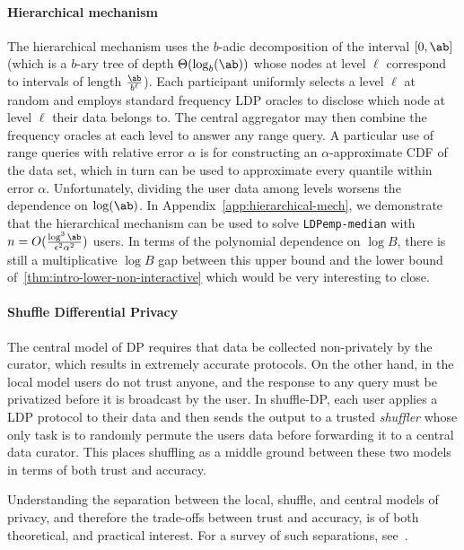 \paragraph{Hierarchical mechanism} 
%
The hierarchical mechanism uses the $b$-adic decomposition of the interval $[0,\ab]$ (which is a $b$-ary tree of depth $\Theta(\log_b(\ab))$ whose nodes at level $\ell$ correspond to intervals of length $\frac{\ab}{b^\ell}$). Each participant uniformly selects a level $\ell$ at random and employs standard frequency LDP oracles \cite{bassily2015local,wang2017locally} to disclose which node at level $\ell$ their data belongs to. The central aggregator may then combine the frequency oracles at each level to answer any range query. 
%
%
A particular use of range queries with relative error $\alpha$ is for constructing an $\alpha$-approximate CDF of the data set, which in turn can be used to approximate every quantile within error $\alpha$. Unfortunately, dividing the user data among levels worsens the dependence on $\log(\ab)$. In Appendix~\ref{app:hierarchical-mech}, we demonstrate that the hierarchical mechanism can be used to solve \texttt{LDPemp-median} with $n =O(\frac{\log^3 \ab}{\epsilon^2 \alpha^2})$ users. %
%
In terms of the polynomial dependence on $\log B$, there is still a multiplicative $\log B$ gap between this upper bound and the lower bound of~\cref{thm:intro-lower-non-interactive} which would be very interesting to close.

\paragraph{Shuffle Differential Privacy}
The central model of DP requires that data be collected non-privately by the curator, which
results in extremely accurate protocols. %
On the other hand, in the local model users do not trust anyone, and the response to any query must be privatized before it is broadcast by the user. In shuffle-DP, each user applies a LDP protocol to their data and then sends the output to a trusted \emph{shuffler} whose only task is to randomly permute the users data before forwarding it to a central data curator. This places shuffling as a middle ground between these two models in terms of both trust and accuracy. 

%
Understanding the separation between the local, shuffle, and central models of privacy, and therefore the trade-offs between trust and accuracy, is of both theoretical, and practical interest. For a survey of such separations, see~\cite{cheu2021differential}. 

